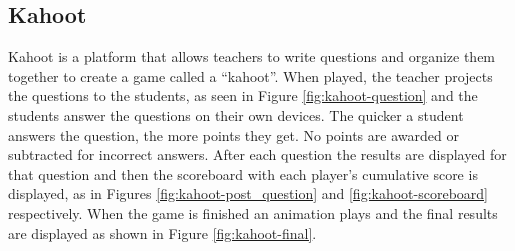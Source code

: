 \documentclass{article}
\begin{document}
    \subsection{Kahoot} \label{kahoot}
        Kahoot is a platform that allows teachers to write questions and organize them together to create a game called a ``kahoot''. When played, the teacher projects the questions to the students, as seen in Figure \ref{fig:kahoot-question} and the students answer the questions on their own devices. The quicker a student answers the question, the more points they get. No points are awarded or subtracted for incorrect answers. After each question the results are displayed for that question and then the scoreboard with each player's cumulative score is displayed, as in Figures \ref{fig:kahoot-post_question} and \ref{fig:kahoot-scoreboard} respectively. When the game is finished an animation plays and the final results are displayed as shown in Figure \ref{fig:kahoot-final}.
        
\end{document}
